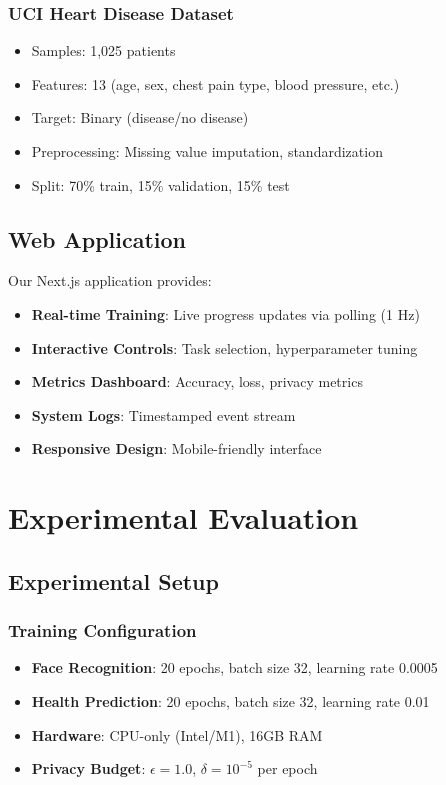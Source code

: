 \documentclass[conference]{IEEEtran}
\begin{document}
\subsubsection{UCI Heart Disease Dataset}

\begin{itemize}
    \item Samples: 1,025 patients
    \item Features: 13 (age, sex, chest pain type, blood pressure, etc.)
    \item Target: Binary (disease/no disease)
    \item Preprocessing: Missing value imputation, standardization
    \item Split: 70\% train, 15\% validation, 15\% test
\end{itemize}

\subsection{Web Application}

Our Next.js application provides:

\begin{itemize}
    \item \textbf{Real-time Training}: Live progress updates via polling (1 Hz)
    \item \textbf{Interactive Controls}: Task selection, hyperparameter tuning
    \item \textbf{Metrics Dashboard}: Accuracy, loss, privacy metrics
    \item \textbf{System Logs}: Timestamped event stream
    \item \textbf{Responsive Design}: Mobile-friendly interface
\end{itemize}

\section{Experimental Evaluation}

\subsection{Experimental Setup}

\subsubsection{Training Configuration}

\begin{itemize}
    \item \textbf{Face Recognition}: 20 epochs, batch size 32, learning rate 0.0005
    \item \textbf{Health Prediction}: 20 epochs, batch size 32, learning rate 0.01
    \item \textbf{Hardware}: CPU-only (Intel/M1), 16GB RAM
    \item \textbf{Privacy Budget}: $\epsilon=1.0$, $\delta=10^{-5}$ per epoch
\end{itemize}
\end{document}
